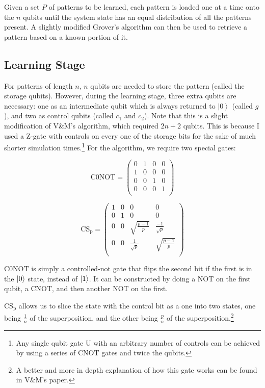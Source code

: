 \documentclass[11pt]{report}
\newcommand{\?}{\stackrel{?}{=}}
\begin{document}
Given a set $P$ of patterns to be learned, each pattern is loaded one at a time onto the $n$ qubits until the system state has an equal distribution of all the patterns present. A slightly modified Grover's algorithm can then be used to retrieve a pattern based on a known portion of it.

\subsection{Learning Stage}

For patterns of length $n$, $n$ qubits are needed to store the pattern (called the storage qubits). However, during the learning stage, three extra qubits are necessary: one as an intermediate qubit which is always returned to $ \left | 0 \right \rangle$ (called $g$), and two as control qubits (called $c_1$ and $c_2$). Note that this is a slight modification of V\&M's algorithm, which required $2n+2$ qubits. This is because I used a Z-gate with controls on every one of the storage bits for the sake of much shorter simulation times.\footnote{Any single qubit gate U with an arbitrary number of controls can be achieved by using a series of CNOT gates and twice the qubits.} For the algorithm, we require two special gates:

$$\mathrm{C0NOT}=\begin{pmatrix}
0 & 1 & 0 & 0 \\
1 & 0 & 0 & 0 \\
0 & 0 & 1 & 0 \\
0 & 0 & 0 & 1 \\
\end{pmatrix}$$

$$\mathrm{CS_p}=\begin{pmatrix}
1 & 0 & 0 & 0 \\
0 & 1 & 0 & 0 \\
0 & 0 & \sqrt{\frac{p-1}{p}} & \frac{-1}{\sqrt{p}} \\
0 & 0 & \frac{1}{\sqrt{p}} & \sqrt{\frac{p-1}{p}} \\
\end{pmatrix}$$

C0NOT is simply a controlled-not gate that flips the second bit if the first is in the $\ket{0}$ state, instead of $\ket{1}$. It can be constructed by doing a NOT on the first qubit, a CNOT, and then another NOT on the first.

$\mathrm{CS_p}$ allows us to slice the state with the control bit as a one into two states, one being $\frac{1}{n}$ of the superposition, and the other being $\frac{p}{n}$ of the superposition.\footnote{A better and more in depth explanation of how this gate works can be found in V\&M's paper.}
\end{document}
